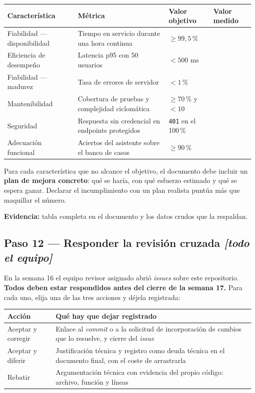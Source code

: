\documentclass[11pt,a4paper]{article}
\newcommand{\paso}[1]{\subsection{#1}}
\begin{document}
	\begin{center}
		\small
		\begin{tabular}{@{}p{3.5cm}p{5.6cm}p{2.6cm}p{2.6cm}@{}}
			\toprule
			\textbf{Característica} & \textbf{Métrica} & \textbf{Valor objetivo} & \textbf{Valor medido} \\
			\midrule
			Fiabilidad --- disponibilidad & Tiempo en servicio durante una hora continua & $\geq 99{,}5\,\%$ & \\
			Eficiencia de desempeño & Latencia p95 con 50 usuarios & $< 500$ ms & \\
			Fiabilidad --- madurez & Tasa de errores de servidor & $< 1\,\%$ & \\
			Mantenibilidad & Cobertura de pruebas y complejidad ciclomática & $\geq 70\,\%$ y $< 10$ & \\
			Seguridad & Respuesta sin credencial en endpoints protegidos & \texttt{401} en el 100\,\% & \\
			Adecuación funcional & Aciertos del asistente sobre el banco de casos & $\geq 90\,\%$ & \\
			\bottomrule
		\end{tabular}
	\end{center}
	
	Para cada característica que no alcance el objetivo, el documento debe incluir un \textbf{plan de mejora concreto}: qué se haría, con qué esfuerzo estimado y qué se espera ganar. Declarar el incumplimiento con un plan realista puntúa más que maquillar el número.
	
	\textbf{Evidencia:} tabla completa en el documento y los datos crudos que la respaldan.
	
	\paso{Paso 12 --- Responder la revisión cruzada \emph{[todo el equipo]}}
	
	En la semana 16 el equipo revisor asignado abrió \emph{issues} sobre este repositorio. \textbf{Todos deben estar respondidos antes del cierre de la semana 17.} Para cada uno, elija una de las tres acciones y déjela registrada:
	
	\begin{center}
		\small
		\begin{tabular}{@{}p{3.6cm}p{11.3cm}@{}}
			\toprule
			\textbf{Acción} & \textbf{Qué hay que dejar registrado} \\
			\midrule
			Aceptar y corregir & Enlace al \emph{commit} o a la solicitud de incorporación de cambios que lo resuelve, y cierre del \emph{issue} \\
			\addlinespace
			Aceptar y diferir & Justificación técnica y registro como deuda técnica en el documento final, con el coste de arrastrarla \\
			\addlinespace
			Rebatir & Argumentación técnica con evidencia del propio código: archivo, función y líneas \\
			\bottomrule
		\end{tabular}
	\end{center}
	
\end{document}
